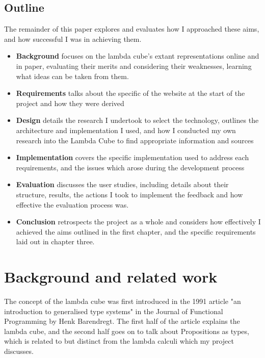 \documentclass{l4proj}
\begin{document}
\section{Outline}

The remainder of this paper explores and evaluates how I approached these aims, and how successful I was in achieving them.

\begin{itemize}
    \item
    \textbf{Background} focuses on the lambda cube's extant representations online and in paper,  evaluating their merits and considering their weaknesses, learning what ideas can be taken from them.
    \item
    \textbf{Requirements} talks about the specific  of the website at the start of the project and how they were derived
    \item
    \textbf{Design} details the research I undertook to select the technology, outlines the architecture and implementation I used, and how I conducted my own research into the Lambda Cube to find appropriate information and sources
    \item
    \textbf{Implementation} covers the specific implementation used to address each requirements, and the issues which arose during the development process
    \item
    \textbf{Evaluation} discusses the user studies, including details about their structure, results, the actions I took to implement the feedback and how effective the evaluation process was.
    \item
    \textbf{Conclusion} retrospects the project as a whole and considers how effectively I achieved the aims outlined in the first chapter, and the specific requirements laid out in chapter three.
    
\end{itemize}

\chapter{Background and related work}

The concept of the lambda cube was first introduced in the 1991 article "an introduction to generalised type systems" in the Journal of Functional Programming by Henk Barendregt.  The first half of the article explains the lambda cube, and the second half goes on to talk about Propositions as types, which is related to but distinct from the lambda calculi which my project discusses.
\end{document}
